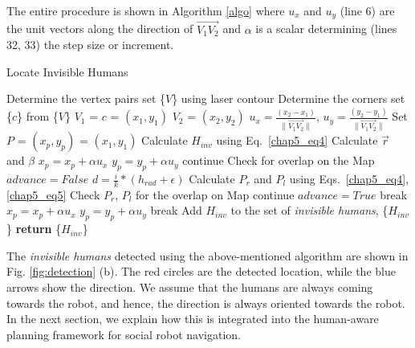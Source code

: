The entire procedure is shown in Algorithm \ref{algo} where $u_x$ and $u_y$ (line 6) are the unit vectors along the direction of $\overrightarrow{V_1V_2}$ and $\alpha$ is a scalar determining (lines 32, 33) the step size or increment.
\begin{algorithm}
\caption{Locate Invisible Humans}\label{algo}
\begin{algorithmic}[1]
\State Determine the vertex pairs set \{$V$\} using laser contour
\State Determine the corners set \{$c$\} from \{$V$\}
\State $V_1$ = $c$ = $(x_1,y_1)$
\State $V_2$ = $(x_2, y_2)$ 
\State $u_x = \frac{(x_2-x_1)}{\lVert\overrightarrow{V_1V_2}\rVert}$, $u_y = \frac{(y_2-y_1)}{\lVert\overrightarrow{V_1V_2}\rVert}$ 
\State Set $P$ = $(x_p,y_p)$ = $(x_1,y_1)$
\State Calculate $H_{inv}$ using Eq.~\eqref{chap5_eq4}
\State Calculate $\overrightarrow{r}$ and $\beta$
\State $x_p = x_p + \alpha u_x$
\State $y_p = y_p + \alpha u_y$
\State continue
\EndIf
\State Check for overlap on the Map
\State $advance = False$
\State $d = \frac{i}{k}* (h_{rad}+\epsilon)$
\State Calculate $P_r$ and $P_l$ using Eqs.~\eqref{chap5_eq4}, \eqref{chap5_eq5}
\State Check $P_r$, $P_l$ for the overlap on Map 
\State continue
\State $advance = True$
\State break
\EndIf
\EndFor
\EndIf
{}
\State $x_p = x_p + \alpha u_x$
\State $y_p = y_p + \alpha u_y$
\State break
\EndIf
\EndWhile
\State Add $H_{inv}$ to the set of \textit{invisible humans}, \{$H_{inv}$\}
\EndFor
\State \textbf{return} \{$H_{inv}$\}
\end{algorithmic}
\end{algorithm}
The \textit{invisible humans} detected using the above-mentioned algorithm are shown in Fig. \ref{fig:detection} (b). The red circles are the detected location, while the blue arrows show the direction. We assume that the humans are always coming towards the robot, and hence, the direction is always oriented towards the robot. In the next section, we explain how this is integrated into the human-aware planning framework for social robot navigation.  


